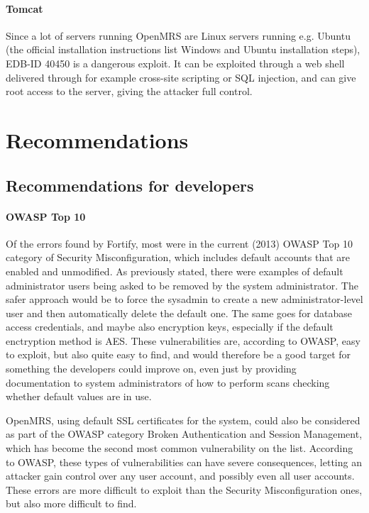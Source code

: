 \documentclass{report} %
\begin{document}
\paragraph{Tomcat}
Since a lot of servers running OpenMRS are Linux servers running e.g. Ubuntu
(the official installation instructions list Windows and Ubuntu installation
steps), EDB-ID 40450 is a dangerous exploit. It can be exploited through a web
shell delivered through for example cross-site scripting or SQL injection, and
can give root access to the server, giving the attacker full control.

\section{Recommendations}

\subsection{Recommendations for developers}

\paragraph{OWASP Top 10}
Of the errors found by Fortify, most were in the current (2013) OWASP Top 10
category of Security Misconfiguration, which includes default accounts that are
enabled and unmodified. As previously stated, there were examples of default
administrator users being asked to be removed by the system administrator. The
safer approach would be to force the sysadmin to create a new
administrator-level user and then automatically delete the default one. The same
goes for database access credentials, and maybe also encryption keys, especially
if the default enctryption method is AES. These vulnerabilities are, according to OWASP,
easy to exploit, but also quite easy to find, and would therefore be a good
target for something the developers could improve on, even just by providing
documentation to system administrators of how to perform scans checking whether
default values are in use.

OpenMRS, using default SSL certificates for the system, could also be considered
as part of the OWASP category Broken Authentication and Session Management,
which has become the second most common vulnerability on the list. According to
OWASP, these types of vulnerabilities can have severe consequences, letting an
attacker gain control over any user account, and possibly even all user accounts.
These errors are more difficult to exploit than the Security Misconfiguration
ones, but also more difficult to find. \autocite[]{owasptop10}
\end{document}
